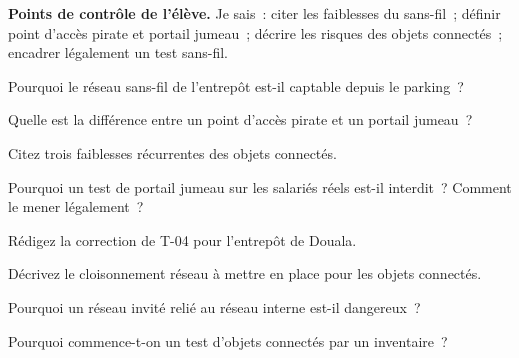 \begin{boxinfo}
\textbf{Points de contrôle de l'élève.} Je sais~: citer les faiblesses du
sans-fil~; définir point d'accès pirate et portail jumeau~; décrire les
risques des objets connectés~; encadrer légalement un test sans-fil.
\end{boxinfo}

\bigskip

\begin{boxexo}[title={\ding{45}\quad Exercice~18.1. Portée \niveaubase}]
Pourquoi le réseau sans-fil de l'entrepôt est-il captable depuis le
parking~?
\end{boxexo}

\begin{boxexo}[title={\ding{45}\quad Exercice~18.2. Jumeau \niveaubase}]
Quelle est la différence entre un point d'accès pirate et un portail
jumeau~?
\end{boxexo}

\begin{boxexo}[title={\ding{45}\quad Exercice~18.3. Objets \niveaubase}]
Citez trois faiblesses récurrentes des objets connectés.
\end{boxexo}

\begin{boxexo}[title={\ding{45}\quad Exercice~18.4. Légalité \niveaumoyen}]
Pourquoi un test de portail jumeau sur les salariés réels est-il interdit~?
Comment le mener légalement~?
\end{boxexo}

\begin{boxexo}[title={\ding{45}\quad Exercice~18.5. T-04 \niveaumoyen}]
Rédigez la correction de T-04 pour l'entrepôt de Douala.
\end{boxexo}

\begin{boxexo}[title={\ding{45}\quad Exercice~18.6. Cloisonnement \niveaumoyen}]
Décrivez le cloisonnement réseau à mettre en place pour les objets
connectés.
\end{boxexo}

\begin{boxexo}[title={\ding{45}\quad Exercice~18.7. Réseau invité \niveaumoyen}]
Pourquoi un réseau invité relié au réseau interne est-il dangereux~?
\end{boxexo}

\begin{boxexo}[title={\ding{45}\quad Exercice~18.8. Inventaire \niveaumoyen}]
Pourquoi commence-t-on un test d'objets connectés par un inventaire~?
\end{boxexo}

